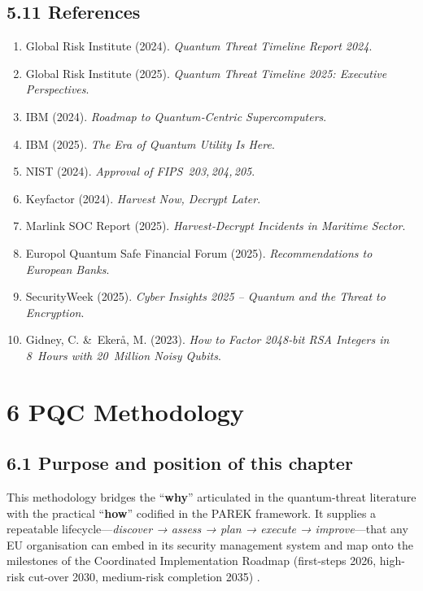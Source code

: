\documentclass[
  english,
]{article}
\providecommand{\tightlist}{%
  \setlength{\itemsep}{0pt}\setlength{\parskip}{0pt}}
\begin{document}
\subsection{5.11 References}\label{references}

\begin{enumerate}
\def\labelenumi{\arabic{enumi}.}
\tightlist
\item
  Global Risk Institute (2024). \emph{Quantum Threat Timeline Report
  2024}.
\item
  Global Risk Institute (2025). \emph{Quantum Threat Timeline 2025:
  Executive Perspectives}.
\item
  IBM (2024). \emph{Roadmap to Quantum‑Centric Supercomputers}.
\item
  IBM (2025). \emph{The Era of Quantum Utility Is Here}.
\item
  NIST (2024). \emph{Approval of FIPS~203,\,204,\,205}.
\item
  Keyfactor (2024). \emph{Harvest Now, Decrypt Later}.
\item
  Marlink SOC Report (2025). \emph{Harvest‑Decrypt Incidents in Maritime
  Sector}.
\item
  Europol Quantum Safe Financial Forum (2025). \emph{Recommendations to
  European Banks}.
\item
  SecurityWeek (2025). \emph{Cyber Insights 2025 -- Quantum and the
  Threat to Encryption}.
\item
  Gidney, C. \&~Ekerå, M. (2023). \emph{How to Factor 2048‑bit RSA
  Integers in 8~Hours with 20~Million Noisy Qubits}.
\end{enumerate}

\section{6 PQC Methodology}\label{pqc-methodology}

\subsection{6.1 Purpose and position of this
chapter}\label{purpose-and-position-of-this-chapter}

This methodology bridges the ``\textbf{why}'' articulated in the
quantum-threat literature with the practical ``\textbf{how}'' codified
in the PAREK framework. It supplies a repeatable
lifecycle---\emph{discover → assess → plan → execute → improve}---that
any EU organisation can embed in its security management system and map
onto the milestones of the Coordinated Implementation Roadmap
(first-steps 2026, high-risk cut-over 2030, medium-risk completion 2035)
.
\end{document}
